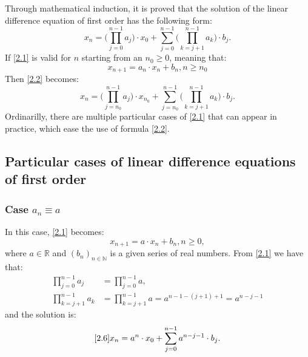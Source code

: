 \documentclass[a4paper,12pt]{report}
\newcommand{\R}{\mathbb{R}}
\begin{document}
Through mathematical induction, it is proved that the solution of the linear difference equation of first order has the following form:
\begin{equation}\label{2.2}
 x_{n}=\bigg( \prod_{j=0}^{n-1} a_{j} \bigg) \cdot x_{0} + \sum_{j=0}^{n-1} \bigg( \prod_{k=j+1}^{n-1} a_{k} \bigg)\cdot b_{j}.
\end{equation}
If \eqref{2.1} is valid for $n$ starting from an $n_{0} \geq 0$, meaning that:
\begin{equation}\label{2.3}
 x_{n+1}=a_{n}\cdot x_{n}+b_{n}, n\geq n_{0}
\end{equation}
Then \eqref{2.2} becomes:
\begin{equation}
 x_{n}=\bigg( \prod_{j=n_{0}}^{n-1} a_{j} \bigg) \cdot x_{n_{0}} + \sum_{j=n_{0}}^{n-1} \bigg( \prod_{k=j+1}^{n-1} a_{k} \bigg)\cdot b_{j}.
\end{equation}
Ordinarilly, there are multiple particular cases of \eqref{2.1} that can appear in practice, which ease the use of formula \eqref{2.2}.
\subsection{Particular cases of linear difference equations of first order}
\subsubsection{Case $a_{n}\equiv a$} \label{i}
In this case, \eqref{2.1} becomes:
\begin{equation}
\label{2.6}
 x_{n+1}=a\cdot x_{n}+b_{n}, n\geq 0,
\end{equation}
where $a\in \R$ and $(b_{n})_{n\in\mathbb{N}}$ is a given series of real numbers.
From \eqref{2.1} we have that:
\begin{align*}
 \prod_{j=0}^{n-1} a_{j} &=\prod_{j=0}^{n-1} a,\\
 \prod_{k=j+1}^{n-1} a_{k}&=\prod_{k=j+1}^{n-1} a=a^{n-1-(j+1)+1}=a^{n-j-1}
\end{align*}
and the solution is:
\begin{equation}\eqref{2.6}
 x_{n}=a^{n}\cdot x_{0}+\sum_{j=0}^{n-1} a^{n-j-1}\cdot b_{j}.
\end{equation}
\end{document}
